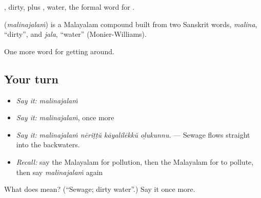 , dirty, plus , water, the formal word for .

\begin{cousinweb}
\textbf{} (\emph{malinajalaṁ}) is a Malayalam compound built from two Sanskrit words, \emph{malina}, \textquotedblleft{}dirty\textquotedblright{}, and \emph{jala}, \textquotedblleft{}water\textquotedblright{} (Monier-Williams).
\end{cousinweb}

\begin{grammarlens}[title={What you've built}]
One more word for getting around.
\end{grammarlens}

\subsection*{Your turn}
\begin{itemize}
\raggedright
  \item \emph{Say it:} \emph{malinajalaṁ}
  \item \emph{Say it:} \emph{malinajalaṁ}, once more
  \item \emph{Say it:} \emph{malinajalaṁ nēriṭṭŭ kāyalilēkkŭ oḻukunnu.} — Sewage flows straight into the backwaters.
  \item \emph{Recall:} say the Malayalam for pollution, then the Malayalam for to pollute, then say \emph{malinajalaṁ} again
\end{itemize}

\begin{tcolorbox}[breakable,colback=teal!4,colframe=teal!35!black,title={Before you move on}]
What does  mean? (\textquotedblleft{}Sewage; dirty water\textquotedblright{}.) Say it once more.
\end{tcolorbox}
